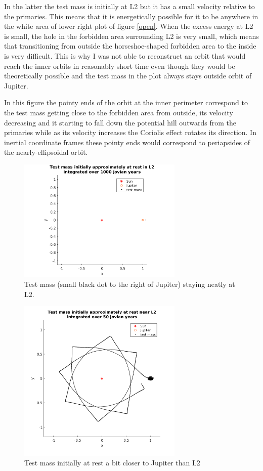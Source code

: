 \documentclass[12pt,a4paper,titlepage]{article}
\begin{document}
In the latter the test mass is initially at L2 but it has a small velocity relative to the primaries. This means that it is energetically possible for it to be anywhere in the white area of lower right plot of figure \ref{open}. When the excess energy at L2 is small, the hole in the forbidden area surrounding L2 is very small, which means that transitioning from outside the horseshoe-shaped forbidden area to the inside is very difficult. This is why I was not able to reconstruct an orbit that would reach the inner orbits in reasonably short time even though they would be theoretically possible and the test mass in the plot always stays outside orbit of Jupiter.

In this figure the pointy ends of the orbit at the inner perimeter correspond to the test mass getting close to the forbidden area from outside, its velocity decreasing and it starting to fall down the potential hill outwards from the primaries while as its velocity increases the Coriolis effect rotates its direction. In inertial coordinate frames these pointy ends would correspond to periapsides of the nearly-ellipsoidal orbit.

\begin{figure}
\centering
\includegraphics[width=0.7\textwidth]{../plots/L2-stationary.png}
\caption{Test mass (small black dot to the right of Jupiter) staying neatly at L2.}
\label{L2-stationary}
\end{figure}

\begin{figure}
\centering
\includegraphics[width=0.7\textwidth]{../plots/L2-orbitsboth.png}
\caption{Test mass initially at rest a bit closer to Jupiter than L2}
\label{L2-left}
\end{figure}
\end{document}
